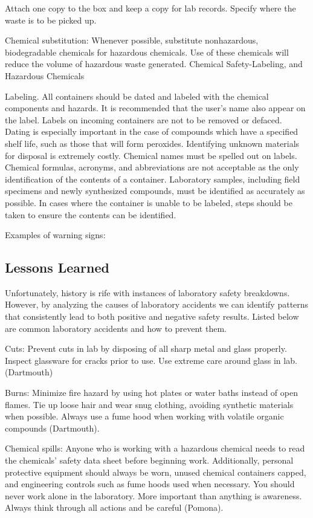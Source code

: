 \documentclass[12pt]{../SOP4_alpha}\usepackage[]{graphicx}\usepackage[]{color}
\begin{document}
\NP Attach one copy to the box and keep a copy for lab records. Specify where the waste is to be picked up. 

\NP Chemical substitution: Whenever possible, substitute nonhazardous, biodegradable chemicals for hazardous chemicals. Use of these chemicals will reduce the volume of hazardous waste generated. 
Chemical Safety-Labeling, and Hazardous Chemicals

\NP Labeling. All containers should be dated and labeled with the chemical components and hazards. It is recommended that the user’s name also appear on the label. Labels on incoming containers are not to be removed or defaced. Dating is especially important in the case of compounds which have a specified shelf life, such as those that will form peroxides. Identifying unknown materials for disposal is extremely costly. Chemical names must be spelled out on labels. Chemical formulas, acronyms, and abbreviations are not acceptable as the only identification of the contents of a container. Laboratory samples, including field specimens and newly synthesized compounds, must be identified as accurately as possible. In cases where the container is unable to be labeled, steps should be taken to ensure the contents can be identified.

\NP Examples of  warning signs:


\subsection*{Lessons Learned}

\NP Unfortunately, history is rife with instances of laboratory safety breakdowns.  However, by analyzing the causes of laboratory accidents we can identify patterns that consistently lead to both positive and negative safety results.  Listed below are common laboratory accidents and how to prevent them.

\NP Cuts: Prevent cuts in lab by disposing of all sharp metal and glass properly.  Inspect glassware for cracks prior to use.  Use extreme care around glass in lab. (Dartmouth)

\NP Burns: Minimize fire hazard by using hot plates or water baths instead of open flames.  Tie up loose hair and wear snug clothing, avoiding synthetic materials when possible.  Always use a fume hood when working with volatile organic compounds (Dartmouth).

\NP Chemical spills: Anyone who is working with a hazardous chemical needs to read the chemicals’ safety data sheet before beginning work.  Additionally, personal protective equipment should always be worn, unused chemical containers capped, and engineering controls such as fume hoods used when necessary.  You should never work alone in the laboratory.  More important than anything is awareness.  Always think through all actions and be careful (Pomona).
\end{document}
